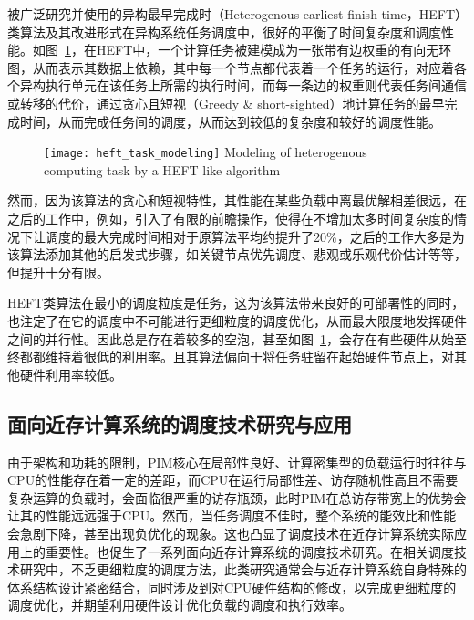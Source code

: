     被广泛研究并使用的异构最早完成时（Heterogenous earliest finish time，HEFT）类算法\citep{topcuoglu_performance-effective_2002}及其改进形式\citep{bittencourt_dag_2010,mack_performant_2022}在异构系统任务调度中，很好的平衡了时间复杂度和调度性能。如图~\ref{fig:heft_task_modeling}，在HEFT中，一个计算任务被建模成为一张带有边权重的有向无环图，从而表示其数据上依赖，其中每一个节点都代表着一个任务的运行，对应着各个异构执行单元在该任务上所需的执行时间，而每一条边的权重则代表任务间通信或转移的代价，通过贪心且短视（Greedy \& short-sighted）地计算任务的最早完成时间，从而完成任务间的调度，从而达到较低的复杂度和较好的调度性能。
 
    \begin{figure}[!htbp]
        \centering
        \texttt{[image: heft\_task\_modeling]}
        {\quad Modeling of heterogenous computing task by a HEFT like algorithm\citep{topcuoglu_performance-effective_2002}}
        \label{fig:heft_task_modeling}
    \end{figure}

    然而，因为该算法的贪心和短视特性，其性能在某些负载中离最优解相差很远，在之后的工作中，例如\citep{bittencourt_dag_2010}，引入了有限的前瞻操作，使得在不增加太多时间复杂度的情况下让调度的最大完成时间相对于原算法平均约提升了20\%，之后的工作大多是为该算法添加其他的启发式步骤，如关键节点优先调度、悲观或乐观代价估计等等，但提升十分有限\citep{arabnejad_list_2014,zhou_list_2017}。
    
    HEFT类算法在最小的调度粒度是任务，这为该算法带来良好的可部署性的同时，也注定了在它的调度中不可能进行更细粒度的调度优化，从而最大限度地发挥硬件之间的并行性。因此总是存在着较多的空泡，甚至如图~\ref{fig:heft_task_modeling}，会存在有些硬件从始至终都都维持着很低的利用率。且其算法偏向于将任务驻留在起始硬件节点上，对其他硬件利用率较低。

    \subsection{面向近存计算系统的调度技术研究与应用}
    
    由于架构和功耗的限制，PIM核心在局部性良好、计算密集型的负载运行时往往与CPU的性能存在着一定的差距，而CPU在运行局部性差、访存随机性高且不需要复杂运算的负载时，会面临很严重的访存瓶颈，此时PIM在总访存带宽上的优势会让其的性能远远强于CPU。然而，当任务调度不佳时，整个系统的能效比和性能会急剧下降，甚至出现负优化的现象\citep{gomez-luna_benchmarking_2021}。这也凸显了调度技术在近存计算系统实际应用上的重要性。也促生了一系列面向近存计算系统的调度技术研究。在相关调度技术研究中，不乏更细粒度的调度方法，此类研究通常会与近存计算系统自身特殊的体系结构设计紧密结合，同时涉及到对CPU硬件结构的修改，以完成更细粒度的调度优化，并期望利用硬件设计优化负载的调度和执行效率。
    
